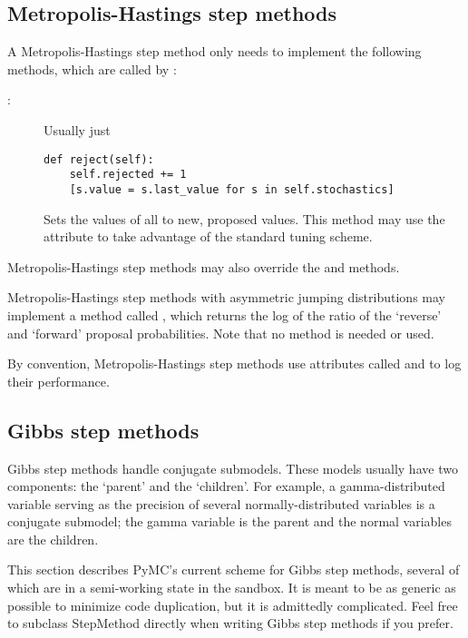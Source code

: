 \subsection{Metropolis-Hastings step methods} \label{user-metro}
A Metropolis-Hastings step method only needs to implement the following methods, which are called by :
\begin{description}
   \item[:] Usually just
   \begin{verbatim}
def reject(self):
    self.rejected += 1
    [s.value = s.last_value for s in self.stochastics]
   \end{verbatim}
   \item[] Sets the values of all  to new, proposed values. This method may use the  attribute to take advantage of the standard tuning scheme.
\end{description}
Metropolis-Hastings step methods may also override the  and  methods.

Metropolis-Hastings step methods with asymmetric jumping distributions may implement a method called , which returns the log of the ratio of the `reverse' and `forward' proposal probabilities. Note that no  method is needed or used.

By convention, Metropolis-Hastings step methods use attributes called  and  to log their performance.

\hypertarget{user-gibbs}{}
\subsection{Gibbs step methods} \label{user-gibbs}

Gibbs step methods handle conjugate submodels. These models usually have two components: the `parent' and the `children'. For example, a gamma-distributed variable serving as the precision of several normally-distributed variables is a conjugate submodel; the gamma variable is the parent and the normal variables are the children. 

This section describes PyMC's current scheme for Gibbs step methods, several of which are in a semi-working state in the sandbox. It is meant to be as generic as possible to minimize code duplication, but it is admittedly complicated. Feel free to subclass StepMethod directly when writing Gibbs step methods if you prefer.

